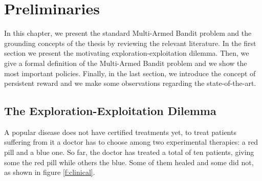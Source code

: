 \chapter{Preliminaries}\label{CPRELIMINARIES}

In this chapter, we present the standard Multi-Armed Bandit problem and the grounding concepts of the thesis by reviewing the relevant literature. In the first section we present the motivating exploration-exploitation dilemma. Then, we give a formal definition of the Multi-Armed Bandit problem and we show the most important policies. Finally, in the last section, we introduce the concept of persistent reward and we make some observations regarding the state-of-the-art.

\section{The Exploration-Exploitation Dilemma}

A popular disease does not have certified treatments yet, to treat patients suffering from it a doctor has to choose among two experimental therapies: a red pill and a blue one. So far, the doctor has treated a total of ten patients, giving some the red pill while others the blue. Some of them healed and some did not, as shown in figure \ref{f:clinical}.

